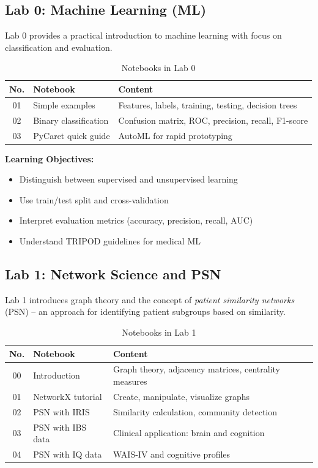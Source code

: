 \documentclass[11pt,a4paper]{article}
\begin{document}
\subsection{Lab 0: Machine Learning (ML)}

Lab 0 provides a practical introduction to machine learning with focus on classification and evaluation.

\begin{table}[htbp]
\centering
\caption{Notebooks in Lab 0}
\label{tab:lab0}
\begin{tabular}{@{}clp{7cm}@{}}
\toprule
\textbf{No.} & \textbf{Notebook} & \textbf{Content} \\
\midrule
01 & Simple examples & Features, labels, training, testing, decision trees \\
02 & Binary classification & Confusion matrix, ROC, precision, recall, F1-score \\
03 & PyCaret quick guide & AutoML for rapid prototyping \\
\bottomrule
\end{tabular}
\end{table}

\textbf{Learning Objectives:}
\begin{itemize}[nosep]
    \item Distinguish between supervised and unsupervised learning
    \item Use train/test split and cross-validation
    \item Interpret evaluation metrics (accuracy, precision, recall, AUC)
    \item Understand TRIPOD guidelines for medical ML
\end{itemize}

\subsection{Lab 1: Network Science and PSN}

Lab 1 introduces graph theory and the concept of \emph{patient similarity networks} (PSN) -- an approach for identifying patient subgroups based on similarity.

\begin{table}[htbp]
\centering
\caption{Notebooks in Lab 1}
\label{tab:lab1}
\begin{tabular}{@{}clp{6.5cm}@{}}
\toprule
\textbf{No.} & \textbf{Notebook} & \textbf{Content} \\
\midrule
00 & Introduction & Graph theory, adjacency matrices, centrality measures \\
01 & NetworkX tutorial & Create, manipulate, visualize graphs \\
02 & PSN with IRIS & Similarity calculation, community detection \\
03 & PSN with IBS data & Clinical application: brain and cognition \\
04 & PSN with IQ data & WAIS-IV and cognitive profiles \\
\bottomrule
\end{tabular}
\end{table}
\end{document}

